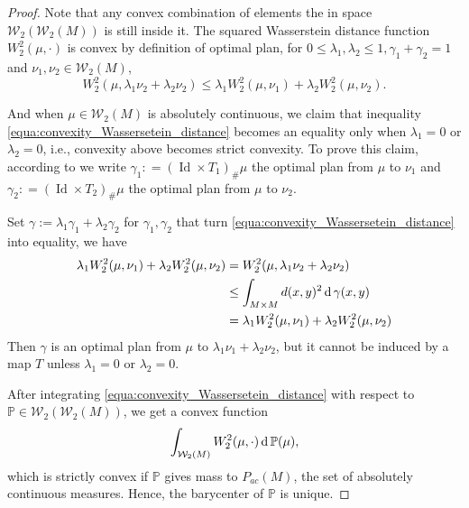 \begin{proof}
	Note that any convex combination of elements the in space $\mathcal{W}_2(\mathcal{W}_2(M))$ is still inside it.
	The squared Wasserstein distance function $W^2_2(\mu, \cdot)$ is convex by definition of optimal plan,
	for $0 \leq \lambda_1, \lambda_2 \leq 1, \gamma_1 + \gamma_2 =1 $ and $ \nu_1,\nu_2 \in \mathcal{W}_2(M)$,
	\begin{equation}
		\label{equa:convexity_Wassersetein_distance}
		W_2^2(\mu, \lambda_1 \nu_2 + \lambda_2 \nu_2) \leq \lambda_1 W_2^2(\mu, \nu_1) + \lambda_2 W_2^2(\mu, \nu_2).
	\end{equation}

	And when $\mu \in \mathcal{W}_2(M)$ is absolutely continuous,
	we claim that inequality \cref{equa:convexity_Wassersetein_distance} becomes an equality only when
	$\lambda_1=0$ or $\lambda_2=0$,
	i.e.,
	convexity above becomes strict convexity.
	To prove this claim,
	according to  we write
	$\gamma_1 : = (\operatorname{Id}  \times T_1)_{\#}\mu$ the optimal plan from $\mu$ to $\nu_1$ and
	$\gamma_2 : = (\operatorname{Id}  \times T_2)_{\#}\mu$ the optimal plan from $\mu$ to $\nu_2$.

	Set $\gamma := \lambda_1 \gamma_1 + \lambda_2 \gamma_2$ for $\gamma_1, \gamma_2$ that turn
	\cref{equa:convexity_Wassersetein_distance} into equality,
	we have
	\begin{align*}
		\lambda_1 W_2^2(\mu, \nu_1) + \lambda_2 W_2^2(\mu, \nu_2) & = W_2^2(\mu, \lambda_1 \nu_2 + \lambda_2 \nu_2)            \\
		                                                          & \leq \int_{M \times M} d(x,y)^2 \operatorname{d} \gamma(x,y)          \\
		                                                          & =	\lambda_1 W_2^2(\mu, \nu_1) + \lambda_2 W_2^2(\mu, \nu_2)
	\end{align*}
	Then $\gamma$ is an optimal plan from $ \mu$ to $\lambda_1 \nu_1 + \lambda_2 \nu_2$,
	but it cannot be induced by a map $T$ unless $\lambda_1 =0$ or $\lambda_2 =0$.

	After integrating \cref{equa:convexity_Wassersetein_distance} with respect to $\mathbb{P} \in \mathcal{W}_2(\mathcal{W}_2(M))$,
	we get a convex function
	\[\int_{\mathcal{W}_2(M)} W_2^2(\mu, \cdot) \operatorname{d} \mathbb{P}(\mu),\]
	which is strictly convex if $\mathbb{P}$ gives mass to $P_{ac}(M)$, the set of absolutely continuous measures.
	Hence, the barycenter of $\mathbb{P}$ is unique.
\end{proof}

